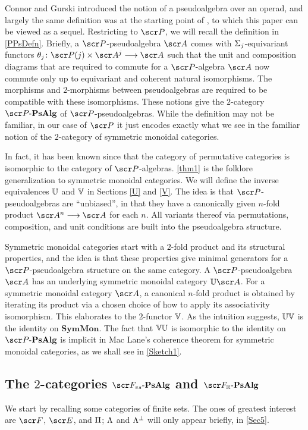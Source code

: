\documentclass{amsart}
\theoremstyle{definition}
\numberwithin{equation}{section}
\newcommand{\PPs}{\sP\text{-}\mathbf{PsAlg}}
\newcommand{\FPs}{\sF_{vs}\text{-}\mathbf{PsAlg}}
\newcommand{\FPR}{\sF_{\bR}\text{-}\mathbf{PsAlg}}
\newcommand{\SM}{\mathbf{SymMon}}
\begin{document}
Connor and Gurski \cite{CG} introduced the notion of a pseudoalgebra over an operad, and largely the same definition was at the starting point of \cite{GMMO1}, to which this paper can be viewed as a sequel.  Restricting to $\sP$, we will recall the definition in \autoref{PPsDefn}.  Briefly, a $\sP$-pseudoalgebra $\sA$ comes with $\Sigma_j$-equivariant functors  $\tha_j\colon \sP(j)\times \sA^j \rtarr \sA$  such that the unit and composition diagrams that are required to commute for a $\sP$-algebra $\sA$ now commute only up to equivariant and coherent natural isomorphisms.  The morphisms and $2$-morphisms between pseudoalgebras are required to be compatible with these isomorphisms.  These notions give the $2$-category $\PPs$ of $\sP$-pseudoalgebras.  While the definition may not be familiar, in our case of $\sP$ it just encodes exactly what we see in the familiar notion of the $2$-category of symmetric monoidal categories. 

In fact, it has been known since \cite{MayPerm} that the category of permutative categories is isomorphic to the category of $\sP$-algebras. 
\autoref{thm1} is the folklore generalization to symmetric monoidal categories.  We will define the inverse equivalences 
$\mathbb{U}$ and $\mathbb{V}$ in Sections \ref{U} and \ref{V}.  The idea is that $\sP$-pseudoalgebras are ``unbiased'', in that they have a canonically given $n$-fold product $\sA^n \rtarr \sA$ for each $n$.  All variants thereof via permutations, composition, and unit conditions are built into the pseudoalgebra structure.  

Symmetric monoidal categories start with a $2$-fold product and its structural properties, and the idea is that these properties give minimal generators for a $\sP$-pseudoalgebra structure on the same category.  A $\sP$-pseudoalgebra $\sA$ has an underlying symmetric monoidal category $\bU \sA$.  For a symmetric monoidal category $\sA$, a canonical $n$-fold product is obtained by iterating its product via a chosen choice of how to apply its associativity isomorphism.  This elaborates to the $2$-functor $\mathbb{V}$. As the intuition suggests, $\mathbb{U} \mathbb{V}$ is the identity on $\SM$. The fact that $\mathbb{V} \mathbb{U}$ is isomorphic to the identity on $\PPs$ is implicit in Mac Lane's coherence theorem for symmetric monoidal categories, as we shall see in \autoref{Sketch1}.

\subsection{The $2$-categories $\FPs$ and $\FPR$}\label{FPs}
We start by recalling some categories of finite sets.  The ones of greatest interest are $\sF$, $\sE$, and $\Pi$; $\Lambda$ and $\Lambda^{\perp}$ will only appear briefly, in \autoref{Sec5}.
\end{document}
